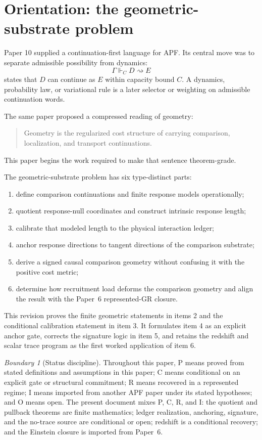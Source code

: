\documentclass[11pt]{article}
\theoremstyle{remark}
\newtheorem{warning}[theorem]{Boundary}
\newcommand{\G}{\Gamma}
\newcommand{\entails}{\Vdash}
\newcommand{\goes}{\rightsquigarrow}
\newcommand{\Status}[1]{\textsf{#1}}
\begin{document}
\tableofcontents

\section{Orientation: the geometric-substrate problem}

Paper 10 supplied a continuation-first language for APF.  Its central move was to separate admissible possibility from dynamics:
\[
        \G\entails_C D\goes E
\]
states that \(D\) can continue as \(E\) within capacity bound \(C\).  A dynamics, probability law, or variational rule is a later selector or weighting on admissible continuation words.

The same paper proposed a compressed reading of geometry:
\begin{quote}
Geometry is the regularized cost structure of carrying comparison, localization, and transport continuations.
\end{quote}
This paper begins the work required to make that sentence theorem-grade.

The geometric-substrate problem has six type-distinct parts:
\begin{enumerate}
\item define comparison continuations and finite response models operationally;
\item quotient response-null coordinates and construct intrinsic response length;
\item calibrate that modeled length to the physical interaction ledger;
\item anchor response directions to tangent directions of the comparison substrate;
\item derive a signed causal comparison geometry without confusing it with the positive cost metric;
\item determine how recruitment load deforms the comparison geometry and align the result with the Paper~6 represented-GR closure.
\end{enumerate}

This revision proves the finite geometric statements in items 2 and the conditional calibration statement in item 3.  It formulates item 4 as an explicit anchor gate, corrects the signature logic in item 5, and retains the redshift and scalar trace program as the first worked application of item 6.

\begin{warning}[Status discipline]
Throughout this paper, \Status{P} means proved from stated definitions and assumptions in this paper; \Status{C} means conditional on an explicit gate or structural commitment; \Status{R} means recovered in a represented regime; \Status{I} means imported from another APF paper under its stated hypotheses; and \Status{O} means open.  The present document mixes \Status{P}, \Status{C}, \Status{R}, and \Status{I}: the quotient and pullback theorems are finite mathematics; ledger realization, anchoring, signature, and the no-trace source are conditional or open; redshift is a conditional recovery; and the Einstein closure is imported from Paper~6.
\end{warning}
\end{document}

